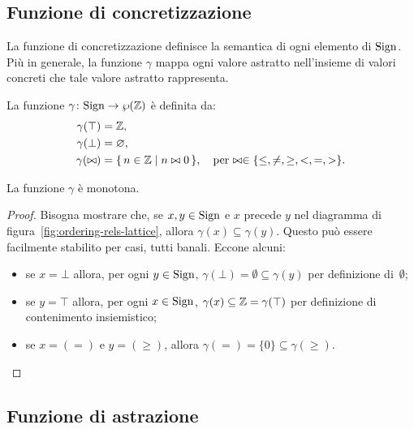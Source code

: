 \subsection{Funzione di concretizzazione}

La funzione di concretizzazione definisce la semantica di ogni
elemento di $\mathrm{Sign}$. Più in generale, la funzione $\gamma$ mappa ogni
valore astratto nell'insieme di valori concreti che tale valore astratto
rappresenta.
\begin{definizione} 
La funzione $\mathord{\gamma}\colon\mathrm{Sign}\to\wp(\mathbb{Z})$ è definita
da:
\begin{align*}
  \gamma(\top) &= \mathbb{Z}, \\
  \gamma(\bot) &= \varnothing, \\
  \gamma(\bowtie) &= \{\, n \in \mathbb{Z} \mid n \bowtie 0 \,\},
    \quad\text{per $\bowtie \in \{ \leq, \neq, \geq, <, =, > \}$.}
\end{align*}
\end{definizione}

\begin{proposizione}
La funzione $\gamma$ è monotona.
\end{proposizione}
\begin{proof}
  Bisogna mostrare che, se $x, y \in \mathrm{Sign}$ e $x$ precede $y$ nel diagramma
  di figura~\ref{fig:ordering-rels-lattice}, allora
  $\gamma(x) \subseteq \gamma(y)$.
  Questo può essere facilmente stabilito per casi, tutti banali.
  Eccone alcuni:
  \begin{itemize}
    \item
      se $x = \bot$ allora, per ogni $y \in \mathrm{Sign}$,
      $\gamma(\bot) = \emptyset \subseteq \gamma(y)$
      per definizione di~$\emptyset$;
    \item
      se $y = \top$ allora, per ogni $x \in \mathrm{Sign}$,
      $\gamma(x) \subseteq \mathbb{Z} = \gamma(\top)$
      per definizione di contenimento insiemistico;
    \item
      se $x = (=)$ e $y = (\geq)$, allora
      $\gamma(=) = \{0\} \subseteq \gamma(\geq)$.
  \end{itemize}
\end{proof}

\subsection{Funzione di astrazione}

